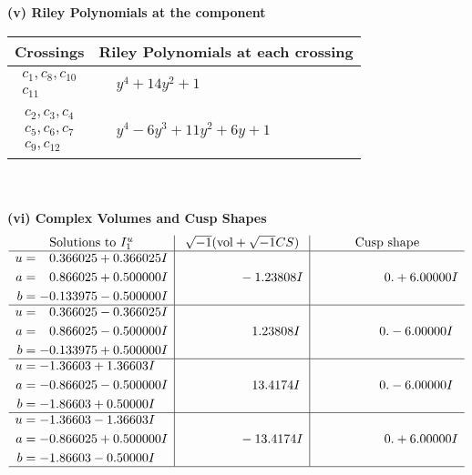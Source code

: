 \documentclass[1p]{elsarticle_modified}
\theoremstyle{definition}
\newcommand{\I}{\sqrt{-1}}
\begin{document}
\newpage\renewcommand{\arraystretch}{1}
\flushleft \textbf{(v) Riley Polynomials at the component}\newline \\
\begin{tabular}{m{50pt}|m{274pt}}
Crossings & \hspace{64pt}Riley Polynomials at each crossing \\
\hline $$\begin{aligned}c_{1},c_{8},c_{10}\\c_{11}\end{aligned}$$&$\begin{aligned}
&y^4+14 y^2+1
\end{aligned}$\\
\hline $$\begin{aligned}c_{2},c_{3},c_{4}\\c_{5},c_{6},c_{7}\\c_{9},c_{12}\end{aligned}$$&$\begin{aligned}
&y^4-6 y^3+11 y^2+6 y+1
\end{aligned}$\\
\hline
\end{tabular}\\~\\
\newpage\flushleft \textbf{(vi) Complex Volumes and Cusp Shapes}
$$\begin{array}{c|c|c}  
\text{Solutions to }I^u_{1}& \I (\text{vol} + \sqrt{-1}CS) & \text{Cusp shape}\\
 \hline 
\begin{aligned}
u &= \phantom{-}0.366025 + 0.366025 I \\
a &= \phantom{-}0.866025 + 0.500000 I \\
b &= -0.133975 - 0.500000 I\end{aligned}
 & \phantom{-0.000000 } -1.23808 I & \phantom{-0.000000 -}0. + 6.00000 I \\ \hline\begin{aligned}
u &= \phantom{-}0.366025 - 0.366025 I \\
a &= \phantom{-}0.866025 - 0.500000 I \\
b &= -0.133975 + 0.500000 I\end{aligned}
 & \phantom{-0.000000 -}1.23808 I & \phantom{-0.000000 } 0. - 6.00000 I \\ \hline\begin{aligned}
u &= -1.36603 + 1.36603 I \\
a &= -0.866025 - 0.500000 I \\
b &= -1.86603 + 0.50000 I\end{aligned}
 & \phantom{-0.000000 -}13.4174 I & \phantom{-0.000000 } 0. - 6.00000 I \\ \hline\begin{aligned}
u &= -1.36603 - 1.36603 I \\
a &= -0.866025 + 0.500000 I \\
b &= -1.86603 - 0.50000 I\end{aligned}
 & \phantom{-0.000000 } -13.4174 I & \phantom{-0.000000 -}0. + 6.00000 I\\
 \hline 
 \end{array}$$\newpage\newpage\renewcommand{\arraystretch}{1}
\end{document}
